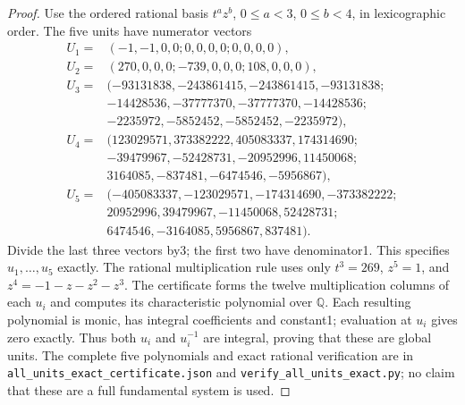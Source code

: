 \begin{proof}
Use the ordered rational basis $t^a z^b$, $0\le a<3$, $0\le b<4$,
in lexicographic order.  The five units have numerator vectors
\[
\begin{aligned}
 U_1={}&(-1,-1,0,0;0,0,0,0;0,0,0,0),\\
 U_2={}&(270,0,0,0;-739,0,0,0;108,0,0,0),\\
 U_3={}&(-93131838,-243861415,-243861415,-93131838;\\
       &-14428536,-37777370,-37777370,-14428536;\\
       &-2235972,-5852452,-5852452,-2235972),\\
 U_4={}&(123029571,373382222,405083337,174314690;\\
       &-39479967,-52428731,-20952996,11450068;\\
       &3164085,-837481,-6474546,-5956867),\\
 U_5={}&(-405083337,-123029571,-174314690,-373382222;\\
       &20952996,39479967,-11450068,52428731;\\
       &6474546,-3164085,5956867,837481).
\end{aligned}
 \tag{QCC.3}
\]
Divide the last three vectors by3; the first two have denominator1.
This specifies $u_1,\ldots,u_5$ exactly.  The rational multiplication
rule uses only $t^3=269$, $z^5=1$, and $z^4=-1-z-z^2-z^3$.
The certificate forms the twelve multiplication columns of each $u_i$
and computes its characteristic polynomial over $\mathbb Q$.
Each resulting polynomial is monic, has integral coefficients and
constant1; evaluation at $u_i$ gives zero exactly.  Thus both $u_i$
and $u_i^{-1}$ are integral, proving that these are global units.
The complete five polynomials and exact rational verification are in
\texttt{all\_units\_exact\_certificate.json} and
\texttt{verify\_all\_units\_exact.py}; no claim that these are a full
fundamental system is used.


\end{proof}

